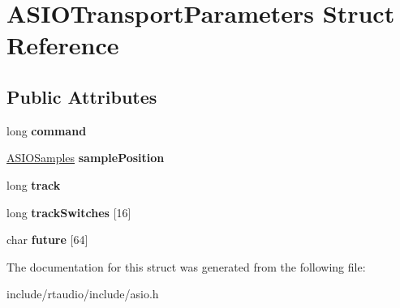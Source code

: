 \hypertarget{struct_a_s_i_o_transport_parameters}{}\section{A\+S\+I\+O\+Transport\+Parameters Struct Reference}
\label{struct_a_s_i_o_transport_parameters}
\subsection*{Public Attributes}
\begin{DoxyCompactItemize}
\item 
long {\bfseries command}\hypertarget{struct_a_s_i_o_transport_parameters_abadbf407987ad61aa75ecb83abf7768d}{}\label{struct_a_s_i_o_transport_parameters_abadbf407987ad61aa75ecb83abf7768d}

\item 
\hyperlink{struct_a_s_i_o_samples}{A\+S\+I\+O\+Samples} {\bfseries sample\+Position}\hypertarget{struct_a_s_i_o_transport_parameters_a885966bcdc830aef32aaa60997fe029d}{}\label{struct_a_s_i_o_transport_parameters_a885966bcdc830aef32aaa60997fe029d}

\item 
long {\bfseries track}\hypertarget{struct_a_s_i_o_transport_parameters_a94adfcdbba15f56b88c696785a01ec50}{}\label{struct_a_s_i_o_transport_parameters_a94adfcdbba15f56b88c696785a01ec50}

\item 
long {\bfseries track\+Switches} \mbox{[}16\mbox{]}\hypertarget{struct_a_s_i_o_transport_parameters_ad298d39e3ccc432a758b1c73215a3c01}{}\label{struct_a_s_i_o_transport_parameters_ad298d39e3ccc432a758b1c73215a3c01}

\item 
char {\bfseries future} \mbox{[}64\mbox{]}\hypertarget{struct_a_s_i_o_transport_parameters_a7ba3468b238e090a3bd65eddee736f1c}{}\label{struct_a_s_i_o_transport_parameters_a7ba3468b238e090a3bd65eddee736f1c}

\end{DoxyCompactItemize}


The documentation for this struct was generated from the following file\+:\begin{DoxyCompactItemize}
\item 
include/rtaudio/include/asio.\+h\end{DoxyCompactItemize}
